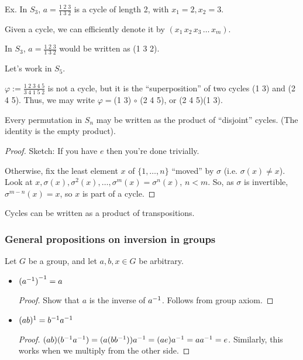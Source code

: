 \documentclass[notes.tex]{subfiles}
\begin{document}
\vspace{0.5em}
Ex. In $S_3$, $a = \frac{1\;2\;3}{1\;3\;2}$ is a cycle of length 2, with $x_1 = 2, x_2= 3$.

\begin{notation}
	Given a cycle, we can efficiently denote it by $(x_1\,x_2\,x_3\,\ldots\,x_m)$.
\end{notation}

\begin{eg}
	In $S_3$, $a = \frac{1\;2\;3}{1\;3\;2}$ would be written as (1 3 2).
\end{eg}

Let's work in $S_5$.

$\varphi := \frac{1\;2\;3\;4\;5}{3\;4\;1\;5\;2}$ is not a cycle, but it is the ``superposition'' of two cycles (1 3) and (2 4 5). Thus, we may write $\varphi = $(1 3) $\circ$ (2 4 5), or (2 4 5)(1 3).

\begin{theorem}
	Every permutation in $S_n$ may be written as the product of ``disjoint'' cycles. (The identity is the empty product).
\end{theorem}

\begin{proof}
	Sketch:
	If you have $e$ then you're done trivially.

	Otherwise, fix the least element $x$ of $\{1, \ldots, n\}$ ``moved'' by $\sigma$ (i.e. $\sigma(x)\ne x$).
	Look at $x, \sigma(x), \sigma^2(x), \ldots, \sigma^m(x) = \sigma^n(x)$, $n<m$.
	So, as $\sigma$ is invertible, $\sigma^{m-n}(x) = x$, so $x$ is part of a cycle.
\end{proof}

\begin{theorem}
	Cycles can be written as a product of transpositions.
\end{theorem}

\subsubsection*{General propositions on inversion in groups}

Let $G$ be a group, and let $a, b, x\in G$ be arbitrary.

\begin{itemize}
	\item ${({a}^{-1})}^{-1} = a$
	\begin{proof}
		Show that $a$ is the inverse of ${a}^{-1}$.
		Follows from group axiom.
	\end{proof}
	\item $(ab)^{1} = {b}^{-1} {a}^{-1}$
	\begin{proof}
		$(ab)({b}^{-1} {a}^{-1}) = (a(b{b}^{-1})) {a}^{-1}  = (a e) {a}^{-1} = a {a}^{-1} = e$.
		Similarly, this works when we multiply from the other side.
	\end{proof}
\end{itemize}
\end{document}
